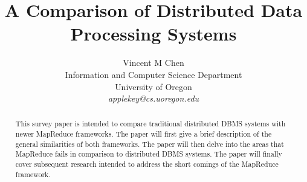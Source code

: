 \documentclass[10pt,twocolumn]{IEEEtran11}
\begin{document}


\title{\Large \bf A Comparison of Distributed Data Processing Systems}
\author{
Vincent M Chen\\
Information and Computer Science Department\\
University of Oregon\\
{\em applekey@cs.uoregon.edu}
}
\maketitle

\begin{abstract}
	
	This survey paper is intended to compare traditional distributed DBMS systems with newer MapReduce frameworks.    The paper will first give a brief description of the general similarities of both frameworks.  The paper will then delve into the areas that MapReduce fails in comparison to distributed DBMS systems.  The paper will finally cover subsequent research intended to address the short comings of the MapReduce framework.
\end{abstract}
\end{document}
